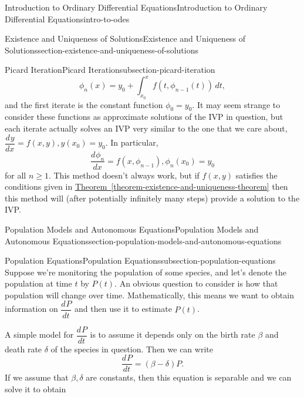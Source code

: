\documentclass[oneside,10pt,]{book}
\numberwithin{equation}{section}
\newcommand{\dv}[3][]{\dfrac{d^{#1} #2}{d #3^{#1}}}
\begin{document}
\begin{chapterptx}{Introduction to Ordinary Differential Equations}{}{Introduction to Ordinary Differential Equations}{}{}{intro-to-odes}
\begin{sectionptx}{Existence and Uniqueness of Solutions}{}{Existence and Uniqueness of Solutions}{}{}{section-existence-and-uniqueness-of-solutions}
\begin{subsectionptx}{Picard Iteration}{}{Picard Iteration}{}{}{subsection-picard-iteration}
\begin{equation*}
\phi_{n}(x) = y_{0}+\int_{x_{0}}^{x}f(t,\phi_{n-1}(t))\,dt,
\end{equation*}
and the first iterate is the constant function \(\phi_{0} = y_{0}.\) It may seem strange to consider these functions as approximate solutions of the IVP in question, but each iterate actually solves an IVP very similar to the one that we care about, \(\dv{y}{x} = f(x,y), y(x_{0}) = y_{0}\). In particular,%
\begin{equation*}
\dv{\phi_{n}}{x} = f(x,\phi_{n-1}), \phi_{n}(x_{0}) = y_{0}
\end{equation*}
for all \(n\geq1\). This method doesn't always work, but if \(f(x,y)\) satisfies the conditions given in \hyperref[theorem-existence-and-uniqueness-theorem]{Theorem~\ref{theorem-existence-and-uniqueness-theorem}} then this method will (after potentially infinitely many steps) provide a solution to the IVP.%
\end{subsectionptx}
\end{sectionptx}
%
%
\typeout{************************************************}
\typeout{************************************************}
%
\begin{sectionptx}{Population Models and Autonomous Equations}{}{Population Models and Autonomous Equations}{}{}{section-population-models-and-autonomous-equations}
%
%
\typeout{************************************************}
\typeout{************************************************}
%
\begin{subsectionptx}{Population Equations}{}{Population Equations}{}{}{subsection-population-equations}
\hypertarget{p-104}{}%
Suppose we're monitoring the population of some species, and let's denote the population at time \(t\) by \(P(t)\). An obvious question to consider is how that population will change over time. Mathematically, this means we want to obtain information on \(\dv{P}{t}\) and then use it to estimate \(P(t)\).%
\par
\hypertarget{p-105}{}%
A simple model for \(\dv{P}{t}\) is to assume it depends only on the birth rate \(\beta\) and death rate \(\delta\) of the species in question. Then we can write%
\begin{equation}
\dv{P}{t} = (\beta - \delta)P.\label{equation-natural-growth}
\end{equation}
If we assume that \(\beta,\delta\) are constants, then this equation is separable and we can solve it to obtain%

\end{subsectionptx}
\end{sectionptx}
\end{chapterptx}
\end{document}
